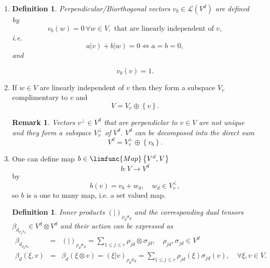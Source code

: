 \documentclass[aps,preprint]{revtex4}
\newtheorem{definition}[theorem]{Definition}
\newtheorem{remark}[theorem]{Remark}
\begin{document}
\begin{enumerate}
\item 
\begin{definition}
\label{Perpendicular/Biorthogonal} Perpendicular/Biorthogonal vectors $%
v_{b}\in \mathcal{L}\left( V^{d}\right) $ are defined by 
\begin{equation}
v_{b}\left( w\right) =0\,\forall w\in V,\text{ that are linearly independent
of }v,
\end{equation}%
i.e. 
\begin{equation}
a\left\vert v\right) +b\left\vert w\right) =0\Leftrightarrow a=b=0,
\end{equation}%
and
\end{definition}

\begin{equation}
v_{b}\left( v\right) =1.
\end{equation}

\item If $w\in V$ are linearly independent of $v$ then they form a subspace $%
V_{v}$ complimentary to $v$ and 
\begin{equation}
V=V_{v}\oplus \left\{ v\right\} .
\end{equation}

\begin{remark}
Vectors $v^{\bot }\in V^{d}$ that are perpendiclar to $v\in V$ are not
unique and they form a subspace $V_{v}^{\bot }$ of $V^{d}.$ $V^{d}$ can be
decomposed into the direct sum 
\begin{equation}
V^{d}=V_{v}^{\bot }\oplus \left\{ v_{b}\right\} .
\end{equation}
\end{remark}

\item One can define map $b\in \limfunc{Map}\left\{ V^{d},V\right\} $ 
\begin{equation}
b:V\rightarrow V^{d}
\end{equation}%
by 
\begin{equation}
b(v)=v_{b}+w_{d},\quad w_{d}\in V_{v}^{\bot },
\end{equation}%
so $b$ is a one to many map, i.e. a set valued map.

\begin{definition}
Inner products $\left( \left. {}\right\vert \right) _{\rho _{d}\sigma _{d}}$
and the corresponding dual tensors $\beta _{d_{\rho _{d}\sigma _{d}}}\in
V^{d}\otimes V^{d}$ and their action can be expressed as 
\begin{eqnarray}
\beta _{d_{\rho _{d}\sigma _{d}}} &=&\left( \left. {}\right\vert \right)
_{\rho _{d}\sigma _{d}}=\sum_{1\leq j\leq r}\rho _{jd}\otimes \sigma
_{jd},\quad \rho _{jd},\sigma _{jd}\in V^{d} \\
\beta _{d}\left( \xi ,v\right) &=&\beta _{d}\left( \xi \otimes v\right)
=\left( \left. \xi \right\vert v\right) _{\rho _{d}\sigma _{d}}=\sum_{1\leq
j\leq r}\rho _{jd}\left( \xi \right) \sigma _{jd}\left( v\right) ,\quad
\forall \xi ,v\in V.
\end{eqnarray}
\end{definition}


\end{enumerate}
\end{document}
